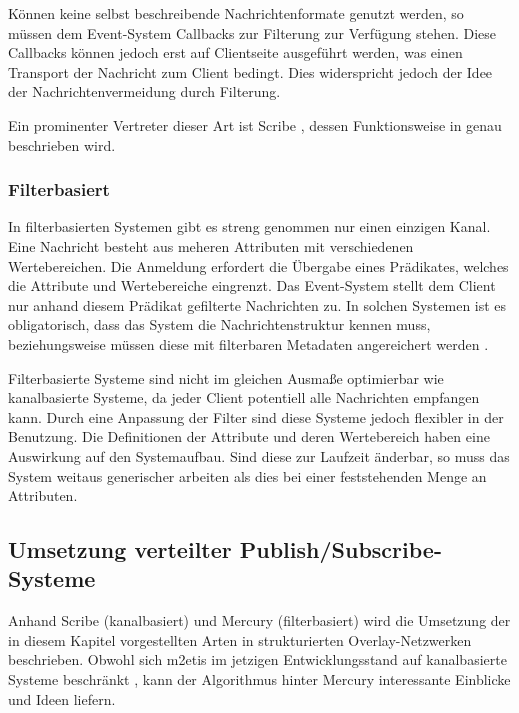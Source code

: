 Können keine selbst beschreibende Nachrichtenformate genutzt werden, so müssen dem Event-System Callbacks zur Filterung zur Verfügung stehen. Diese Callbacks können jedoch erst auf Clientseite ausgeführt werden, was einen Transport der Nachricht zum Client bedingt. Dies widerspricht jedoch der Idee der Nachrichtenvermeidung durch Filterung.

Ein prominenter Vertreter dieser Art ist Scribe \cite{Castro2002Scribe}, dessen Funktionsweise in  genau beschrieben wird.

\subsubsection{Filterbasiert}
\label{chap:grundlagen:pubsub:filterbased}
In filterbasierten Systemen gibt es streng genommen nur einen einzigen Kanal. Eine Nachricht besteht aus meheren Attributen mit verschiedenen Wertebereichen. Die Anmeldung erfordert die Übergabe eines Prädikates, welches die Attribute und Wertebereiche eingrenzt. Das Event-System stellt dem Client nur anhand diesem Prädikat gefilterte Nachrichten zu. In solchen Systemen ist es obligatorisch, dass das System die Nachrichtenstruktur kennen muss, beziehungsweise müssen diese mit filterbaren Metadaten angereichert werden \cite{PiEyKoSh2007-PubSubAPI}.

Filterbasierte Systeme sind nicht im gleichen Ausmaße optimierbar wie kanalbasierte Systeme, da jeder Client potentiell alle Nachrichten empfangen kann. Durch eine Anpassung der Filter sind diese Systeme jedoch flexibler in der Benutzung. Die Definitionen der Attribute und deren Wertebereich haben eine Auswirkung auf den Systemaufbau. Sind diese zur Laufzeit änderbar, so muss das System weitaus generischer arbeiten als dies bei einer feststehenden Menge an Attributen.

\subsection{Umsetzung verteilter Publish/Subscribe-Systeme}
Anhand Scribe (kanalbasiert) \cite{Castro2002Scribe} und Mercury (filterbasiert) \cite{Bharambe2004Mercury} wird die Umsetzung der in diesem Kapitel vorgestellten Arten in strukturierten Overlay-Netzwerken beschrieben. Obwohl sich \ac{m2etis} im jetzigen Entwicklungsstand auf kanalbasierte Systeme beschränkt \cite{Fischer2010a}, kann der Algorithmus hinter Mercury interessante Einblicke und Ideen liefern.

